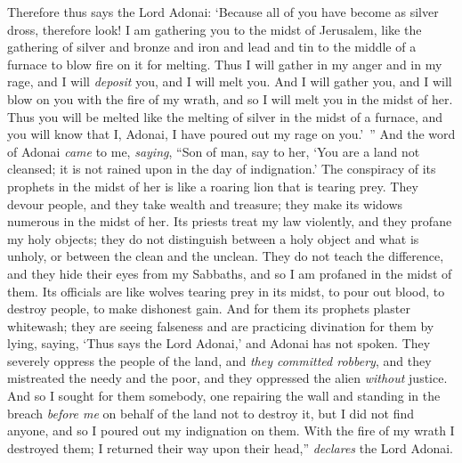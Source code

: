 \begin{biblechapter}
\verse Therefore thus says the Lord Adonai: ‘Because all of you have become as silver dross, therefore look! I am gathering you to the midst of Jerusalem,
\verse like the gathering of silver and bronze and iron and lead and tin to the middle of a furnace to blow fire on it for melting. Thus I will gather in my anger and in my rage, and I will \textit{deposit} you, and I will melt you.
\verse And I will gather you, and I will blow on you with the fire of my wrath, and so I will melt you in the midst of her.
\verse Thus you will be melted like the melting of silver in the midst of a furnace, and you will know that I, Adonai, I have poured out my rage on you.’ ”
\verse And the word of Adonai \textit{came} to me, \textit{saying},
\verse “Son of man, say to her, ‘You are a land not cleansed; it is not rained upon in the day of indignation.’
\verse The conspiracy of its prophets in the midst of her is like a roaring lion that is tearing prey. They devour people, and they take wealth and treasure; they make its widows numerous in the midst of her.
\verse Its priests treat my law violently, and they profane my holy objects; they do not distinguish between a holy object and what is unholy, or between the clean and the unclean. They do not teach the difference, and they hide their eyes from my Sabbaths, and so I am profaned in the midst of them.
\verse Its officials are like wolves tearing prey in its midst, to pour out blood, to destroy people, to make dishonest gain.
\verse And for them its prophets plaster whitewash; they are seeing falseness and are practicing divination for them by lying, saying, ‘Thus says the Lord Adonai,’ and Adonai has not spoken.
\verse They severely oppress the people of the land, and \textit{they committed robbery}, and they mistreated the needy and the poor, and they oppressed the alien \textit{without} justice.
\verse And so I sought for them somebody, one repairing the wall and standing in the breach \textit{before me} on behalf of the land not to destroy it, but I did not find anyone,
\verse and so I poured out my indignation on them. With the fire of my wrath I destroyed them; I returned their way upon their head,” \textit{declares} the Lord Adonai.
\end{biblechapter}

